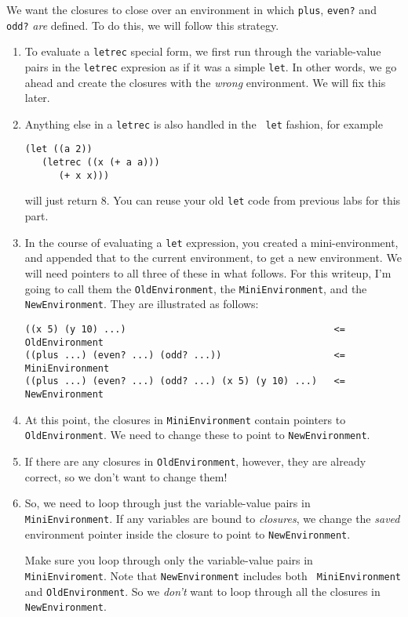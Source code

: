 \documentclass{article}
\begin{document}
We want the closures to close over an environment in which {\tt plus},
{\tt even?} and {\tt odd?} {\em are} defined.  To do this, we will follow
this strategy.
\begin{enumerate}
\item To evaluate a {\tt letrec} special form,
  we first run through the variable-value pairs in the {\tt letrec}
    expresion as if it was a simple {\tt let}.  In other words, we go
    ahead and create the closures with the {\em wrong} environment.
    We will fix this later.
  \item Anything else in a {\tt letrec} is also handled in the {\tt
    let} fashion, for example
\begin{Verbatim}
(let ((a 2))
   (letrec ((x (+ a a)))
      (+ x x)))
\end{Verbatim}
will just return 8.
You can reuse your old {\tt let} code from  previous
labs for this part.
\item In the course of evaluating a {\tt let} expression,
  you created a mini-environment, and appended that to the current
  environment, to get a new environment.  We will need pointers to all
  three of these in what follows.  For this writeup, I'm going to call
  them the {\tt OldEnvironment}, the {\tt MiniEnvironment}, and
  the {\tt NewEnvironment}.  They are illustrated as follows:
\begin{Verbatim}
((x 5) (y 10) ...)                                     <= OldEnvironment
((plus ...) (even? ...) (odd? ...))                    <= MiniEnvironment
((plus ...) (even? ...) (odd? ...) (x 5) (y 10) ...)   <= NewEnvironment
\end{Verbatim}
\item At this point, the closures in {\tt MiniEnvironment}
  contain pointers to {\tt OldEnvironment}.  We need to change these
  to point to {\tt NewEnvironment}.
\item If there are any closures in {\tt OldEnvironment}, however, they
  are already correct, so we don't want to change them!

\item So, we need to loop through just the variable-value pairs in {\tt
  MiniEnvironment}.  If any variables are bound to {\em closures}, we
  change the {\em saved} environment pointer inside the closure to
  point to {\tt NewEnvironment}.

 Make sure you loop through only the variable-value pairs in {\tt
  MiniEnviroment}. Note that {\tt NewEnvironment} includes both {\tt
  MiniEnvironment} and {\tt OldEnvironment}. So we {\em don't } want
  to loop through all the closures in {\tt NewEnvironment}.


\end{enumerate}
\end{document}
